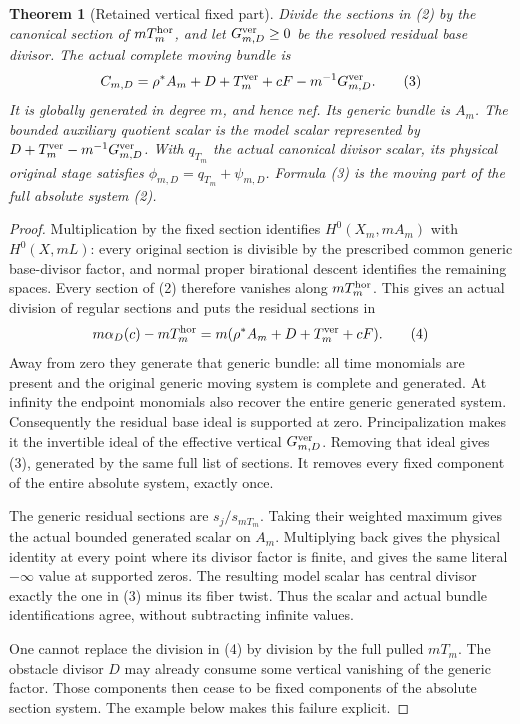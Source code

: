\documentclass[10pt]{article}
\newtheorem{theorem}{Theorem}[section]
\begin{document}
\begin{theorem}[Retained vertical fixed part]\label{verticalformula}
Divide the sections in (2) by the canonical section of
$mT_m^{\rm hor}$, and let $G_{m,D}^{\rm ver}\geq0$ be the
resolved residual base divisor. The actual complete moving bundle is
\[
 C_{m,D}=\rho^*A_m+D+T_m^{\rm ver}+cF
                       -m^{-1}G_{m,D}^{\rm ver}.          \tag{3}
\]
It is globally generated in degree $m$, and hence nef. Its generic
bundle is $A_m$. The bounded auxiliary quotient scalar is the model
scalar represented by $D+T_m^{\rm ver}-m^{-1}G_{m,D}^{\rm ver}$.
With $q_{T_m}$ the actual canonical divisor scalar, its physical
original stage satisfies $\phi_{m,D}=q_{T_m}+\psi_{m,D}$.
Formula (3) is the moving part of the \emph{full} absolute system (2).
\end{theorem}
\begin{proof}
Multiplication by the fixed section identifies
$H^0(X_m,mA_m)$ with $H^0(X,mL)$: every original section is divisible by
the prescribed common generic base-divisor factor, and normal proper
birational descent identifies the remaining spaces. Every section of
(2) therefore vanishes along $mT_m^{\rm hor}$. This gives an actual
division of regular sections and puts the residual sections in
\[
 m\alpha_D(c)-mT_m^{\rm hor}
   =m(\rho^*A_m+D+T_m^{\rm ver}+cF).                      \tag{4}
\]
Away from zero they generate that generic bundle: all time monomials
are present and the original generic moving system is complete and
generated. At infinity the endpoint monomials also recover the entire
generic generated system. Consequently the residual base ideal is
supported at zero. Principalization makes it the invertible ideal of
the effective vertical $G_{m,D}^{\rm ver}$. Removing that ideal gives
(3), generated by the same full list of sections. It removes every
fixed component of the entire absolute system, exactly once.

The generic residual sections are $s_j/s_{mT_m}$. Taking their
weighted maximum gives the actual bounded generated scalar on $A_m$.
Multiplying back gives the physical identity at every point where its
divisor factor is finite, and gives the same literal $-\infty$ value
at supported zeros. The resulting model scalar has central divisor
exactly the one in (3) minus its fiber twist. Thus the scalar and actual
bundle identifications agree, without subtracting infinite values.

One cannot replace the division in (4) by division by the full pulled
$mT_m$. The obstacle divisor $D$ may already consume some vertical
vanishing of the generic factor. Those components then cease to be
fixed components of the absolute section system. The example below
makes this failure explicit.
\end{proof}
\end{document}
